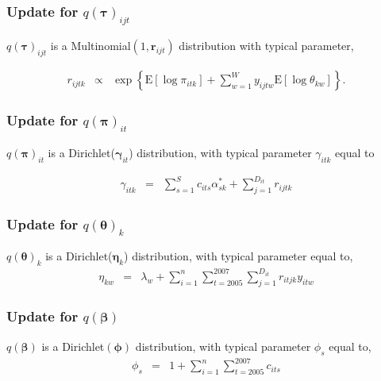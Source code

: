 \documentclass{beamer}
\numberwithin{equation}{section}
\begin{document}
\begin{frame}
\frametitle{Update for $q(\boldsymbol{\tau})_{ijt} $ }
$q(\boldsymbol{\tau})_{ijt} $ is a Multinomial$(1,
\boldsymbol{r}_{ijt})$ distribution with typical parameter,
\scriptsize

\begin{eqnarray}
r_{ijtk} & \propto & \exp \left\{\text{E}[\log \pi_{itk}] +
\sum_{w=1}^{W} y_{ijtw}\text{E}[\log \theta_{kw}] \right\}.\nonumber
\end{eqnarray}

\end{frame}

\begin{frame}
\frametitle{Update for $q(\boldsymbol{\pi})_{it}$}
$q(\boldsymbol{\pi})_{it}$ is a
Dirichlet($\boldsymbol{\gamma}_{it}$) distribution, with typical
parameter $\gamma_{itk}$ equal to

\scriptsize
\begin{eqnarray}
\gamma_{itk}  & = & \sum_{s=1}^{S} c_{its} \alpha_{sk}^{*} +
\sum_{j=1}^{D_{it}} r_{ijtk} \nonumber
\end{eqnarray}



\end{frame}


\begin{frame}
\frametitle{Update for $q(\boldsymbol{\theta})_{k}$}
$q(\boldsymbol{\theta})_{k}$ is a Dirichlet($\boldsymbol{\eta}_k$)
distribution, with typical parameter equal to, \scriptsize
\begin{eqnarray}
\eta_{kw} & = & \lambda_w + \sum_{i=1}^{n} \sum_{t=2005}^{2007}
\sum_{j=1}^{D_{it}}r_{itjk}y_{itw} \nonumber
\end{eqnarray}
\end{frame}

\begin{frame}
\frametitle{Update for $q(\boldsymbol{\beta} )$}
$q(\boldsymbol{\beta} )$ is a Dirichlet$(\boldsymbol{\phi})$
distribution, with typical parameter $\phi_s$ equal to,\scriptsize
\begin{eqnarray}
\phi_s & = & 1 + \sum_{i=1}^{n} \sum_{t=2005}^{2007} c_{its}
\nonumber
\end{eqnarray}

\end{frame}
\end{document}
